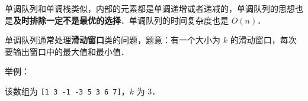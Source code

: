 
单调队列和单调栈类似，内部的元素都是单调递增或者递减的，单调队列的思想也是\textbf{及时排除一定不是最优的选择}．单调队列的时间复杂度也是 $O(n)$．

单调队列通常处理\textbf{滑动窗口}类的问题，题意：有一个大小为 $k$ 的滑动窗口，每次要输出窗口中的最大值和最小值．

举例：

该数组为 \verb|[1 3 -1 -3 5 3 6 7]|，$k$ 为 $3$．

